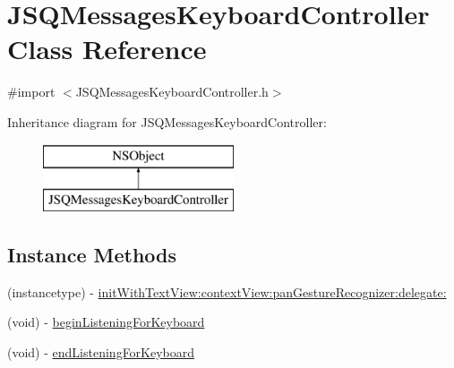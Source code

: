 \hypertarget{interface_j_s_q_messages_keyboard_controller}{}\section{J\+S\+Q\+Messages\+Keyboard\+Controller Class Reference}
\label{interface_j_s_q_messages_keyboard_controller}


{\ttfamily \#import $<$J\+S\+Q\+Messages\+Keyboard\+Controller.\+h$>$}

Inheritance diagram for J\+S\+Q\+Messages\+Keyboard\+Controller\+:\begin{figure}[H]
\begin{center}
\leavevmode
\includegraphics[height=2.000000cm]{interface_j_s_q_messages_keyboard_controller}
\end{center}
\end{figure}
\subsection*{Instance Methods}
\begin{DoxyCompactItemize}
\item 
(instancetype) -\/ \hyperlink{interface_j_s_q_messages_keyboard_controller_a2f9062c6b57d0dbe141189b8978dee72}{init\+With\+Text\+View\+:context\+View\+:pan\+Gesture\+Recognizer\+:delegate\+:}
\item 
(void) -\/ \hyperlink{interface_j_s_q_messages_keyboard_controller_a47a097e782ec215e80642719ee43eb3a}{begin\+Listening\+For\+Keyboard}
\item 
(void) -\/ \hyperlink{interface_j_s_q_messages_keyboard_controller_a65a4ab5bd93ed8350f034839ad608af5}{end\+Listening\+For\+Keyboard}
\end{DoxyCompactItemize}

